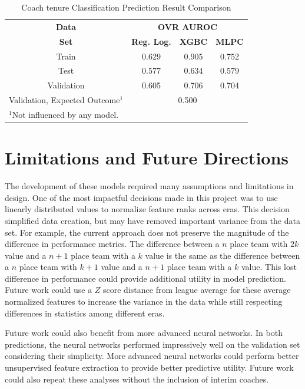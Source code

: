 \documentclass[conference]{IEEEtran}
\begin{document}
\begin{table}[htbp]
\caption{Coach tenure Classification Prediction Result Comparison}
\begin{center}
\begin{tabular}{|c||c|c|c|}
\hline
\textbf{Data} & \multicolumn{3}{|c|}{\textbf{OVR AUROC}}\\
\cline{2-4} 
\textbf{Set} & \textbf{Reg. Log.} &  \textbf{XGBC} &  \textbf{MLPC} \\
\hline
\hline
Train & 0.629 & 0.905 & 0.752\\
\hline
Test & 0.577 & 0.634 & 0.579 \\
\hline
Validation & 0.605 & 0.706 & 0.704 \\
\hline
Validation, Expected Outcome$^{\mathrm{1}}$ & \multicolumn{3}{|c|}{0.500} \\
\hline
\multicolumn{2}{l}{$^{\mathrm{1}}$Not influenced by any model.}
\end{tabular}
\label{cum2}
\end{center}
\end{table}

\section{Limitations and Future Directions}
The development of these models required many assumptions and limitations in design. One of the most impactful decisions made in this project was to use linearly distributed values to normalize feature ranks across eras. This decision simplified data creation, but may have removed important variance from the data set. For example, the current approach does not preserve the magnitude of the difference in performance metrics. The difference between a $n$ place team with $2k$ value and a $n+1$ place team with a $k$ value is the same as the difference between a $n$ place team with $k+1$ value and a $n+1$ place team with a $k$ value. This lost difference in performance could provide additional utility in model prediction. Future work could use a $Z$ score distance from league average for these average normalized features to increase the variance in the data while still respecting differences in statistics among different eras.

Future work could also benefit from more advanced neural networks. In both predictions, the neural networks performed impressively well on the validation set considering their simplicity. More advanced neural networks could perform better unsupervised feature extraction to provide better predictive utility. Future work could also repeat these analyses without the inclusion of interim coaches. 
\end{document}
